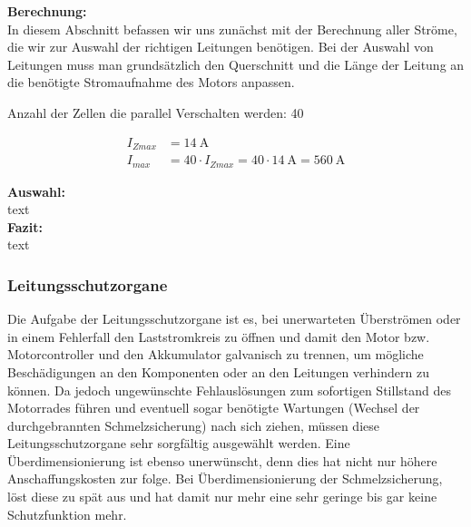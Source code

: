 \textbf{Berechnung:} 
\\[2mm]
In diesem Abschnitt befassen wir uns zunächst mit der Berechnung aller Ströme, die wir zur Auswahl der richtigen Leitungen benötigen. Bei der Auswahl von Leitungen muss man grundsätzlich den Querschnitt und die Länge der Leitung an die benötigte Stromaufnahme des Motors anpassen.

Anzahl der Zellen die parallel Verschalten werden: 40


\begin{align*}
I_{Zmax} &= 14~\mathrm{A}	\\
I_{max} &= 40 \cdot I_{Zmax} = 40 \cdot 14~\mathrm{A} = 560~\mathrm{A}
\end{align*}
%


%



\textbf{Auswahl:}
\\[2mm]
text
\\[5mm]

\textbf{Fazit:}
\\[2mm]
text

\newpage



\subsubsection{Leitungsschutzorgane}
Die Aufgabe der Leitungsschutzorgane ist es, bei unerwarteten Überströmen oder in einem Fehlerfall den Laststromkreis zu öffnen und damit den Motor bzw. Motorcontroller und den Akkumulator galvanisch zu trennen, um mögliche Beschädigungen an den Komponenten oder an den Leitungen verhindern zu können. Da jedoch ungewünschte Fehlauslösungen zum sofortigen Stillstand des Motorrades führen und eventuell sogar benötigte Wartungen (Wechsel der durchgebrannten Schmelzsicherung) nach sich ziehen, müssen diese Leitungsschutzorgane sehr sorgfältig ausgewählt werden. Eine Überdimensionierung ist ebenso unerwünscht, denn dies hat nicht nur höhere Anschaffungskosten zur folge. Bei Überdimensionierung der Schmelzsicherung, löst diese zu spät aus und hat damit nur mehr eine sehr geringe bis gar keine Schutzfunktion mehr. 

